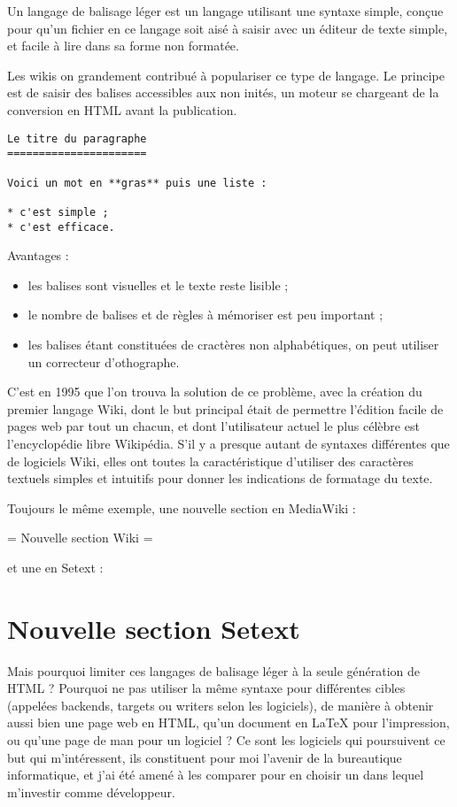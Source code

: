 \documentclass[]{article}
\begin{document}
Un langage de balisage léger est un langage utilisant une syntaxe
simple, conçue pour qu'un fichier en ce langage soit aisé à saisir avec
un éditeur de texte simple, et facile à lire dans sa forme non formatée.

Les wikis on grandement contribué à populariser ce type de langage. Le
principe est de saisir des balises accessibles aux non inités, un moteur
se chargeant de la conversion en HTML avant la publication.

\begin{verbatim}
Le titre du paragraphe
======================

Voici un mot en **gras** puis une liste :

* c'est simple ;
* c'est efficace.
\end{verbatim}
Avantages :

\begin{itemize}
\item
  les balises sont visuelles et le texte reste lisible ;
\item
  le nombre de balises et de règles à mémoriser est peu important ;
\item
  les balises étant constituées de cractères non alphabétiques, on peut
  utiliser un correcteur d'othographe.
\end{itemize}
C'est en 1995 que l'on trouva la solution de ce problème, avec la
création du premier langage Wiki, dont le but principal était de
permettre l'édition facile de pages web par tout un chacun, et dont
l'utilisateur actuel le plus célèbre est l'encyclopédie libre Wikipédia.
S'il y a presque autant de syntaxes différentes que de logiciels Wiki,
elles ont toutes la caractéristique d'utiliser des caractères textuels
simples et intuitifs pour donner les indications de formatage du texte.

Toujours le même exemple, une nouvelle section en MediaWiki :

= Nouvelle section Wiki =

et une en Setext :

\section{Nouvelle section Setext}

Mais pourquoi limiter ces langages de balisage léger à la seule
génération de HTML ? Pourquoi ne pas utiliser la même syntaxe pour
différentes cibles (appelées backends, targets ou writers selon les
logiciels), de manière à obtenir aussi bien une page web en HTML, qu'un
document en LaTeX pour l'impression, ou qu'une page de man pour un
logiciel ? Ce sont les logiciels qui poursuivent ce but qui
m'intéressent, ils constituent pour moi l'avenir de la bureautique
informatique, et j'ai été amené à les comparer pour en choisir un dans
lequel m'investir comme développeur.
\end{document}
